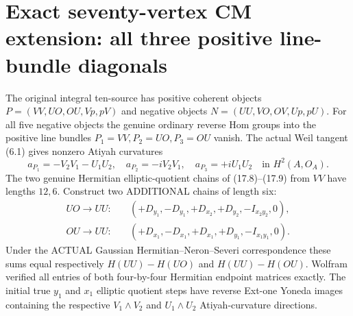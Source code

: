 \documentclass[11pt,a4paper]{article}
\begin{document}
\section{Exact seventy-vertex CM extension: all three positive line-bundle diagonals}
The original integral ten-source has positive coherent objects
\(P=(VV,UO,OU,Vp,pV)\) and negative objects
\(N=(UU,VO,OV,Up,pU)\).
For all five negative objects the genuine ordinary
reverse Hom groups into the positive line bundles
\(P_1=VV,P_2=UO,P_3=OU\) vanish. The actual
Weil tangent (6.1) gives nonzero Atiyah curvatures
\[
 a_{P_1}=-V_2V_1-U_1U_2,\quad
 a_{P_2}=-iV_2V_1,\quad
 a_{P_3}=+iU_1U_2\quad\text{in }H^2(A,O_A).
\]
The two genuine Hermitian elliptic-quotient chains of
(17.8)--(17.9) from \(VV\) have lengths \(12,6\).
Construct two ADDITIONAL chains of length six:
\[
\begin{split}
 UO\to UU:\quad&
 (+D_{y_1},-D_{y_1},+D_{x_2},+D_{y_2},
                         -I_{x_2y_2},0),\\
 OU\to UU:\quad&
 (+D_{x_1},-D_{x_1},+D_{x_1},+D_{y_1},
                         -I_{x_1y_1},0).
\end{split}                                              \tag{18.1}
\]
Under the ACTUAL Gaussian Hermitian--Neron--Severi
correspondence these sums equal respectively
\(H(UU)-H(UO)\) and \(H(UU)-H(OU)\).
Wolfram verified all entries of both four-by-four
Hermitian endpoint matrices exactly.
The initial true \(y_1\) and \(x_1\) elliptic
quotient steps have reverse Ext-one Yoneda
images containing the respective
\(V_1\wedge V_2\) and \(U_1\wedge U_2\)
Atiyah-curvature directions.
\end{document}
